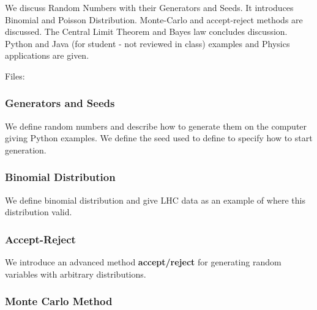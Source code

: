 We discuss Random Numbers with their Generators and Seeds. It introduces
Binomial and Poisson Distribution. Monte-Carlo and accept-reject methods
are discussed. The Central Limit Theorem and Bayes law concludes
discussion. Python and Java (for student - not reviewed in class)
examples and Physics applications are given.


Files:


\subsubsection{Generators and Seeds}\label{generators-and-seeds}

We define random numbers and describe how to generate them on the
computer giving Python examples. We define the seed used to define to
specify how to start generation.



\subsubsection{Binomial Distribution}\label{binomial-distribution}

We define binomial distribution and give LHC data as an example of where
this distribution valid.


\subsubsection{Accept-Reject}\label{accept-reject}

We introduce an advanced method \textbf{accept/reject} for generating
random variables with arbitrary distributions.


\subsubsection{Monte Carlo Method}\label{monte-carlo-method}

